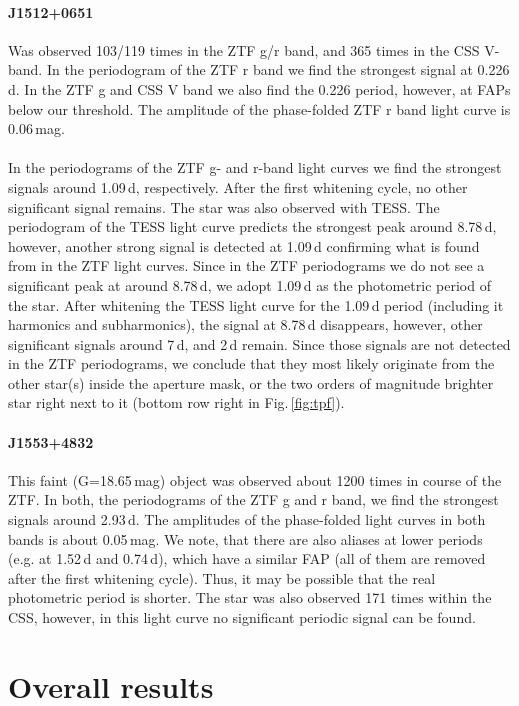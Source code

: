 \documentclass{aa}
\newcommand{\fg}[1]{\mbox{Fig.\,\ref{#1}}}
\begin{document}
\paragraph{J1512+0651}
Was observed 103/119 times in the ZTF g/r band, and 365 times in the CSS
V-band. In the periodogram of the ZTF r band we find the strongest signal
at 0.226\,d. In the ZTF g and CSS V band we also find the 0.226
period, however, at FAPs below our threshold. The amplitude of the
phase-folded ZTF r band light curve is 0.06\,mag.
\paragraph{}
In the periodograms of the ZTF g- and r-band light curves we find the strongest
signals around 1.09\,d, respectively. After the first whitening cycle, no
other significant signal remains. The star was also observed with TESS.
The periodogram of the TESS light curve predicts the strongest peak around
8.78\,d, however, another strong signal is detected at
1.09\,d confirming what is found from in the ZTF light
curves. Since in the ZTF periodograms we do not see a significant peak at around
8.78\,d, we adopt 1.09\,d as the photometric period of the star.
After whitening the TESS light curve for the 1.09\,d period (including it
harmonics and subharmonics), the signal at 8.78\,d disappears, however,
other significant signals around 7\,d, and 2\,d remain. Since those signals
are not detected in the ZTF periodograms, we conclude that they most likely
originate from the other star(s) inside the aperture mask, or the two orders of
magnitude brighter star right next to it (bottom row right in \fg{fig:tpf}).
\paragraph{J1553+4832}
This faint (G=18.65\,mag) object was observed about 1200 times in
course of the ZTF. In both, the periodograms of the ZTF g and r band, we
find the strongest signals around 2.93\,d. The amplitudes of the phase-folded light
curves in both bands is about 0.05\,mag. We note, that there are also
aliases at lower periods (e.g. at 1.52\,d and 0.74\,d), which have a
similar FAP (all of them are removed after the first whitening cycle).
Thus, it may be possible that the real photometric period is shorter. The star was
also observed 171 times within the CSS, however, in this light
curve no significant periodic signal can be found.
 
\section{Overall results}
\label{sect:results}
 
\end{document}
